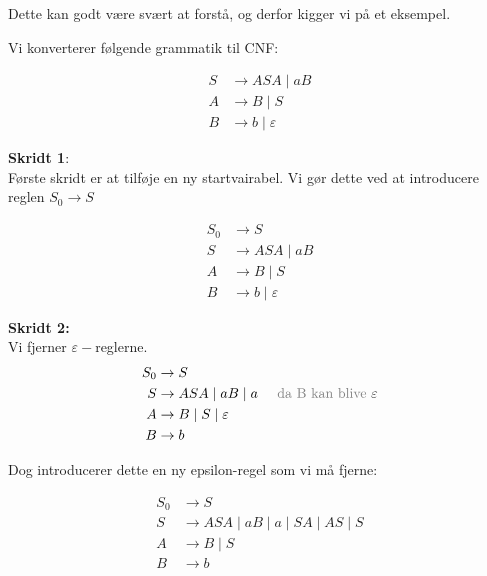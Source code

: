 Dette kan godt være svært at forstå, og derfor kigger vi på et eksempel.

\begin{example}
	Vi konverterer følgende grammatik til CNF:

	\begin{equation*}
		\begin{split}
			S & \rightarrow ASA\;|\;aB         \\
			A & \rightarrow B\;|\;S            \\
			B & \rightarrow b\;|\; \varepsilon
		\end{split}
	\end{equation*}

	\noindent
	\textbf{\large Skridt 1}:\\
	\noindent
	Første skridt er at tilføje en ny startvairabel. Vi gør dette ved at introducere reglen $S_{0} \rightarrow S$

	\begin{equation*}
		\begin{split}
			S_{0} & \rightarrow S                   \\
			S     & \rightarrow ASA \;|\; aB        \\
			A     & \rightarrow B \;|\; S           \\
			B     & \rightarrow b \;|\; \varepsilon
		\end{split}
	\end{equation*}

	\noindent
	\textbf{\large Skridt 2:}\\
	\noindent
	Vi fjerner $\varepsilon-$reglerne.
	\begin{equation*}
		\begin{split}
			S_{0} & \rightarrow S                                                                            \\
			S     & \rightarrow ASA \;|\; aB \;|\; a\;\;\;\;\; \text{\color{gray}da B kan blive }\varepsilon \\
			A     & \rightarrow B \;|\; S \; | \; \varepsilon                                                \\
			B     & \rightarrow b
		\end{split}
	\end{equation*}

	\noindent
	Dog introducerer dette en ny epsilon-regel som vi må fjerne:


	\begin{equation*}
		\begin{split}
			S_{0} & \rightarrow S                                              \\
			S     & \rightarrow ASA \;|\; aB \;|\; a \;| \;SA \;| \;AS \;| \;S \\
			A     & \rightarrow B \;|\; S                                      \\
			B     & \rightarrow b
		\end{split}
	\end{equation*}


\end{example}
